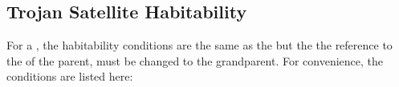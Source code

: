 \documentclass[letterpaper,10pt,english]{sphinxmanual}
\begin{document}
\subsection{Trojan Satellite Habitability}
\label{\detokenize{quantities/habitability/trojan_satellite_habitability:trojan-satellite-habitability}}\label{\detokenize{quantities/habitability/trojan_satellite_habitability::doc}}\label{\detokenize{quantities/habitability/trojan_satellite_habitability:id1}}
\sphinxAtStartPar
For a {\hyperref[\detokenize{celestial_bodies/trojan_satellite:id1}]{}}, the habitability conditions are the same as the
{\hyperref[\detokenize{quantities/habitability/planet_habitability:id1}]{}}
but the the reference to the {\hyperref[\detokenize{quantities/habitability/habitable_zones/habitable_zones:id1}]{}} of the parent, must be changed to the grandparent.
For convenience, the conditions are listed here:
\end{document}
